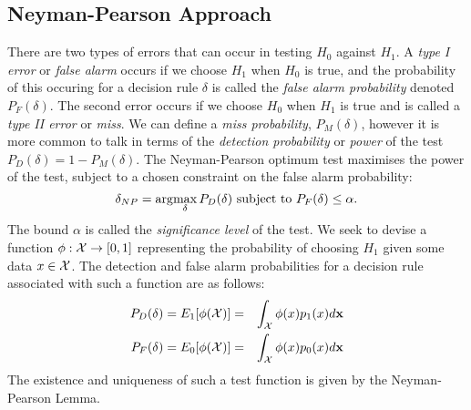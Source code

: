 \subsection{Neyman-Pearson Approach}
There are two types of errors that can occur in testing $H_0$ against $H_1$. A \textit{type I error} or \textit{false alarm} occurs if we choose $H_1$ when $H_0$ is true, and the probability of this occuring for a decision rule $\delta$ is called the \textit{false alarm probability} denoted $P_F(\delta)$. The second error occurs if we choose $H_0$ when $H_1$ is true and is called a \textit{type II error} or \textit{miss}. We can define a \textit{miss probability}, $P_M(\delta)$, however it is more common to talk in terms of the \textit{detection probability} or \textit{power} of the test $P_D(\delta)=1-P_M(\delta)$. The Neyman-Pearson optimum test maximises the power of the test, subject to a chosen constraint on the false alarm probability:
\begin{equation}
\delta_{NP}=\arg\!\max_{\delta} P_D(\delta) \mbox{ subject to } P_F(\delta)\leq \alpha.
\end{equation}
The bound $\alpha$ is called the \textit{significance level} of the test. We seek to devise a function $\phi: \mathcal{X} \rightarrow [0,1]$ representing the probability of choosing $H_1$ given some data $x\in \mathcal{X}$. The detection and false alarm probabilities for a decision rule associated with such a function are as follows:
\begin{eqnarray}
P_D(\delta) = E_1[\phi(\mathcal{X})]  &=& \int_{\mathcal{X}} \phi(x) p_1(x) d{\mathbf{x}}  \label{eq:PDrandomised} \\
P_F(\delta) = E_0[\phi(\mathcal{X})]  &=& \int_{\mathcal{X}} \phi(x) p_0(x) d{\mathbf{x}} \label{eq:PFrandomised}
\end{eqnarray}
The existence and uniqueness of such a test function is given by the Neyman-Pearson Lemma.

